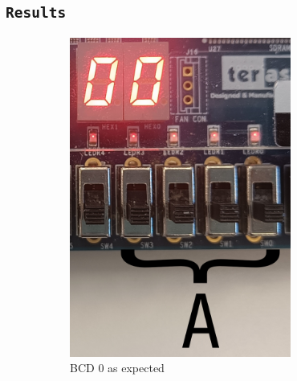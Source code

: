 \documentclass{article}
\let\oldsubsection\subsection
\renewcommand{\subsection}[1]{%
  \oldsubsection{\texttt{#1}}%
  \setcounter{subsubsection}{-1}%
}
\begin{document}
\clearpage
\subsection{Results}
\begin{figure}[h]
    \centering
    \begin{subfigure}{0.4\textwidth}
        \centering
        \includegraphics[width=0.8\textwidth]{Figures/Part2-0.jpg}
        \caption{BCD 0 as expected}
        \label{fig:T02pic1}
    \end{subfigure}
    \hfill
    \begin{subfigure}{0.4\textwidth}
        \centering

\end{subfigure}
\end{figure}
\end{document}
